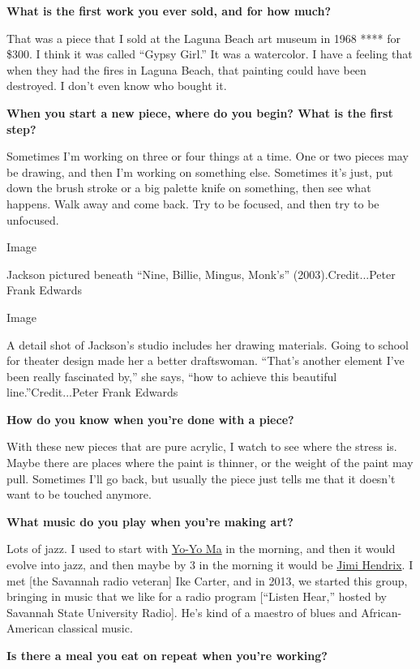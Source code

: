 \textbf{What is the first work you ever sold, and for how much?}

That was a piece that I sold at the Laguna Beach art museum in 1968 ****
for \$300. I think it was called ``Gypsy Girl.'' It was a watercolor. I
have a feeling that when they had the fires in Laguna Beach, that
painting could have been destroyed. I don't even know who bought it.

\textbf{When you start a new piece, where do you begin? What is the
first step?}

Sometimes I'm working on three or four things at a time. One or two
pieces may be drawing, and then I'm working on something else. Sometimes
it's just, put down the brush stroke or a big palette knife on
something, then see what happens. Walk away and come back. Try to be
focused, and then try to be unfocused.

Image

Jackson pictured beneath ``Nine, Billie, Mingus, Monk's''
(2003).Credit...Peter Frank Edwards

Image

A detail shot of Jackson's studio includes her drawing materials. Going
to school for theater design made her a better draftswoman. ``That's
another element I've been really fascinated by,'' she says, ``how to
achieve this beautiful line.''Credit...Peter Frank Edwards

\textbf{How do you know when you're done with a piece?}

With these new pieces that are pure acrylic, I watch to see where the
stress is. Maybe there are places where the paint is thinner, or the
weight of the paint may pull. Sometimes I'll go back, but usually the
piece just tells me that it doesn't want to be touched anymore.

\textbf{What music do you play when you're making art?}

Lots of jazz. I used to start with
\href{https://www.nytimes.com/topic/person/yoyo-ma}{Yo-Yo Ma} in the
morning, and then it would evolve into jazz, and then maybe by 3 in the
morning it would be
\href{https://www.nytimes.com/topic/person/jimi-hendrix}{Jimi Hendrix}.
I met {[}the Savannah radio veteran{]} Ike Carter, and in 2013, we
started this group, bringing in music that we like for a radio program
{[}``Listen Hear,'' hosted by Savannah State University Radio{]}. He's
kind of a maestro of blues and African-American classical music.

\textbf{Is there a meal you eat on repeat when you're working?}

